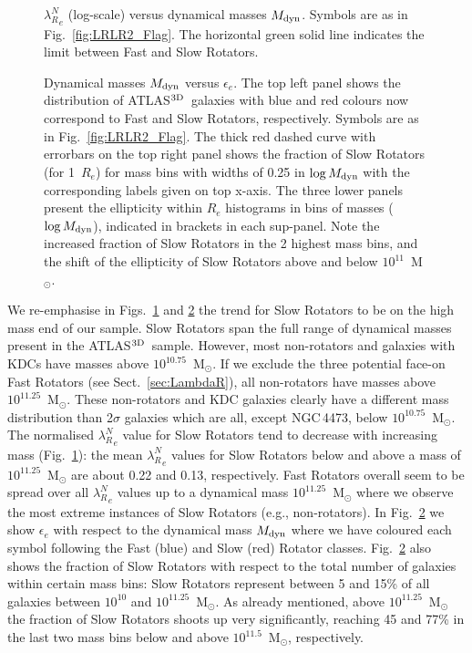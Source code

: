 \documentclass[useAMS,usenatbib,usegraphicx]{mn2e}
\newcommand{\atlas}{{ATLAS$^{\rm 3D}$}}
\begin{document}
\begin{figure}
\centering
{}
\caption{${\lambda_R^N}_{e}$ (log-scale) versus dynamical masses $M_{\rm dyn}$. Symbols are
as in Fig.~\ref{fig:LRLR2_Flag}. The horizontal green solid line indicates the limit
between Fast and Slow Rotators.}
\label{fig:LRNMass}
\end{figure}
\begin{figure}
\centering
{}
\caption{Dynamical masses $M_{\rm dyn}$ versus ${\epsilon}_{e}$. The top left panel
shows the distribution of \atlas\ galaxies with blue and red colours now correspond to
Fast and Slow Rotators, respectively. Symbols are as in Fig.~\ref{fig:LRLR2_Flag}.
The thick red dashed curve with errorbars on the top right panel shows the fraction of Slow Rotators 
(for 1~$R_e$) for mass bins with widths of 0.25 in $\log{M_{\rm dyn}}$ with the corresponding labels given 
on top x-axis.
The three lower panels present the
ellipticity within $R_e$ histograms in bins of masses ($\log{M_{\rm dyn}}$), indicated in brackets
in each sup-panel. Note the increased fraction of Slow Rotators in the 2
highest mass bins, and the shift of the ellipticity of Slow Rotators above and
below $10^{11}$~M$_{\odot}$.}
\label{fig:EpsMass}
\end{figure}

We re-emphasise in Figs.~\ref{fig:LRNMass} and \ref{fig:EpsMass} the trend for Slow Rotators to
be on the high mass end of our sample. 
Slow Rotators span the full range of
dynamical masses present in the \atlas\ sample. However, most non-rotators and
galaxies with KDCs have masses above $10^{10.75}$~M$_{\odot}$. If we exclude
the three potential face-on Fast Rotators (see Sect.~\ref{sec:LambdaR}), 
all non-rotators have masses above $10^{11.25}$~M$_{\odot}$.
These non-rotators and KDC galaxies clearly have a different mass distribution
than 2$\sigma$ galaxies which are all, except NGC\,4473, below $10^{10.75}$~M$_{\odot}$.
The normalised ${\lambda_R^N}_e$ value for
Slow Rotators tend to decrease with increasing mass (Fig.~\ref{fig:LRNMass}): the mean
${\lambda_R^N}_e$ values for Slow Rotators below and above a mass of $10^{11.25}$~M$_{\odot}$
are about 0.22 and 0.13, respectively. Fast Rotators overall seem to
be spread over all ${\lambda_R^N}_e$ values up to a dynamical mass $10^{11.25}$~M$_{\odot}$ where
we observe the most extreme instances of Slow Rotators (e.g., non-rotators).
In Fig.~\ref{fig:EpsMass} we show ${\epsilon}_{e}$
with respect to the dynamical mass $M_{\rm dyn}$ where we have
coloured each symbol following the Fast (blue) and Slow (red) Rotator classes. 
Fig.~\ref{fig:EpsMass} also shows the fraction of Slow Rotators with respect to
the total number of galaxies within certain mass bins: Slow Rotators represent
between 5 and 15\% of all galaxies between $10^{10}$ and $10^{11.25}$~M$_{\odot}$. 
As already mentioned, above $10^{11.25}$~M$_{\odot}$ the fraction of Slow
Rotators shoots up very significantly, reaching 45 and 77\% in the last two mass
bins below and above $10^{11.5}$~M$_{\odot}$, respectively.
\end{document}
